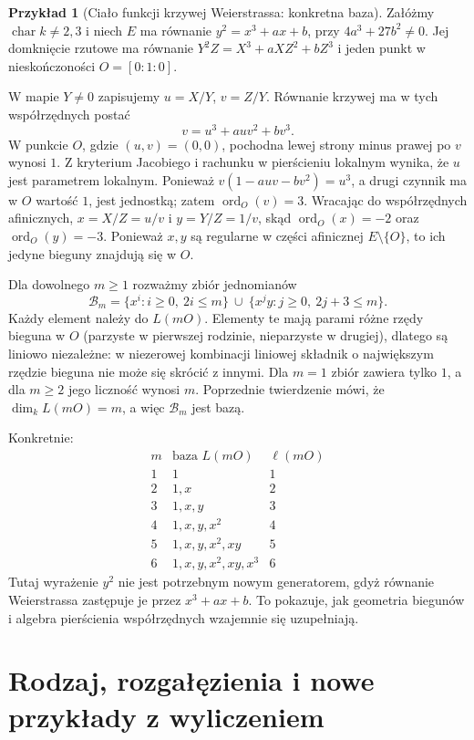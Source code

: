 \documentclass[11pt,a4paper,openany]{report}
\numberwithin{equation}{section}
\theoremstyle{plain}
\theoremstyle{definition}
\newtheorem{przyklad}[twierdzenie]{Przykład}
\theoremstyle{remark}
\begin{document}
\begin{przyklad}[Ciało funkcji krzywej Weierstrassa: konkretna baza]
\label{prz:weierstrass-LmO}
Załóżmy $\operatorname{char}k\ne2,3$ i niech $E$ ma równanie
$y^2=x^3+ax+b$, przy $4a^3+27b^2\ne0$.
Jej domknięcie rzutowe ma równanie
$Y^2Z=X^3+aXZ^2+bZ^3$ i jeden punkt
w nieskończoności $O=[0:1:0]$.

W mapie $Y\ne0$ zapisujemy $u=X/Y$, $v=Z/Y$.
Równanie krzywej ma w tych współrzędnych postać
\[
 v=u^3+auv^2+bv^3.
\]
W punkcie $O$, gdzie $(u,v)=(0,0)$,
pochodna lewej strony minus prawej po $v$
wynosi $1$. Z kryterium Jacobiego i rachunku
w pierścieniu lokalnym wynika, że $u$ jest
parametrem lokalnym. Ponieważ
$v(1-auv-bv^2)=u^3$, a drugi czynnik ma w $O$
wartość $1$, jest jednostką; zatem
$\operatorname{ord}_O(v)=3$.
Wracając do współrzędnych afinicznych,
$x=X/Z=u/v$ i $y=Y/Z=1/v$, skąd
$\operatorname{ord}_O(x)=-2$ oraz
$\operatorname{ord}_O(y)=-3$.
Ponieważ $x,y$ są regularne w części afinicznej $E\setminus\{O\}$,
to ich jedyne bieguny znajdują się w $O$.

Dla dowolnego $m\ge1$ rozważmy zbiór jednomianów
\[
 \mathcal B_m=
 \{x^i: i\ge0,\ 2i\le m\}\ \cup\
 \{x^j y:j\ge0,\ 2j+3\le m\}.
\]
Każdy element należy do $L(mO)$. Elementy te mają
parami różne rzędy bieguna w $O$ (parzyste w pierwszej
rodzinie, nieparzyste w drugiej), dlatego są liniowo
niezależne: w niezerowej kombinacji liniowej składnik
o największym rzędzie bieguna nie może się skrócić z innymi.
Dla $m=1$ zbiór zawiera tylko $1$, a dla $m\ge2$
jego liczność wynosi $m$. Poprzednie twierdzenie mówi,
że $\dim_kL(mO)=m$, a więc $\mathcal B_m$ jest bazą.

Konkretnie:
\[
\begin{array}{c|l|c}
 m & \text{baza }L(mO) & \ell(mO)\\ \hline
 1 & 1 & 1\\
 2 & 1,x & 2\\
 3 & 1,x,y & 3\\
 4 & 1,x,y,x^2 & 4\\
 5 & 1,x,y,x^2,xy & 5\\
 6 & 1,x,y,x^2,xy,x^3 & 6
\end{array}
\]
Tutaj wyrażenie $y^2$ nie jest potrzebnym nowym generatorem,
gdyż równanie Weierstrassa zastępuje je przez $x^3+ax+b$.
To pokazuje, jak geometria biegunów i algebra pierścienia
współrzędnych wzajemnie się uzupełniają.
\end{przyklad}

\section{Rodzaj, rozgałęzienia i nowe przykłady z wyliczeniem}
\label{sec:ramification-examples}
\end{document}
